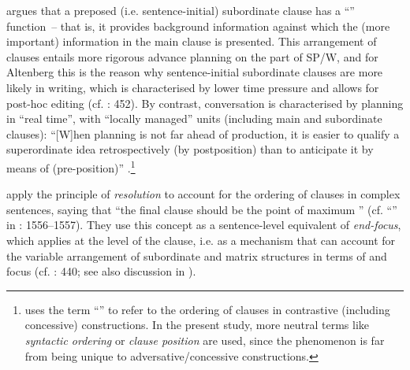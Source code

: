 \citet[21]{Altenberg1986} argues that a preposed (i.e. sentence-initial) subordinate clause has a “” function~– that is, it provides background information against which the (more important) information in the main clause is presented. This arrangement of clauses entails more rigorous advance planning on the part of SP/W, and for Altenberg this is the reason why sentence-initial subordinate clauses are more likely in writing, which is charac\-te\-rised by lower time pressure and allows for post-hoc editing (cf. \citealt{Diessel2005}: 452). By contrast, conversation is characterised by planning in “real time”, with “locally managed” units (including main and subordinate clauses): “[W]hen planning is not far ahead of production, it is easier to qualify a superordinate idea retrospectively (by postposition) than to anticipate it by means of  (pre-position)” \citep[21]{Altenberg1986}.\footnote{\citet[20–24]{Altenberg1986} uses the term “” to refer to the ordering of clauses in contrastive (including concessive) constructions. In the present study, more neutral terms like \textit{syntactic ordering} or \textit{clause position} are used, since the phenomenon is far from being unique to adversative/concessive constructions.}

\citet[1036]{QuirkEtAl1985} apply the principle of \textit{resolution} to account for the ordering of clauses in complex sentences, saying that “the final clause should be the point of maximum ” (cf. “” in \citealt{QuirkEtAl1985}: 1556–1557). They use this concept as a sentence-level equivalent of \textit{end-focus}, which applies at the level of the clause, i.e. as a mechanism that can account for the variable arrangement of subordinate and matrix structures in terms of  and focus (cf. \citealt{Chafe1984}: 440; see also discussion in \citealt{Schützler2018a}).

